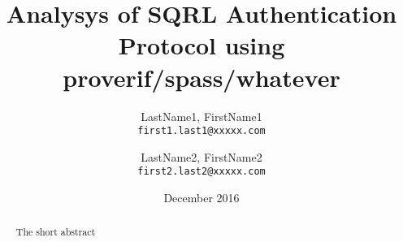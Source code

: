 \documentclass{article}
\title{Analysys of SQRL Authentication Protocol using proverif/spass/whatever}
\author{LastName1, FirstName1\\
	\texttt{first1.last1@xxxxx.com}
	\and
	LastName2, FirstName2\\
	\texttt{first2.last2@xxxxx.com}
}
\date{December 2016}
\begin{document}
\maketitle

\begin{abstract}
	The short abstract
\end{abstract}
\end{document}
